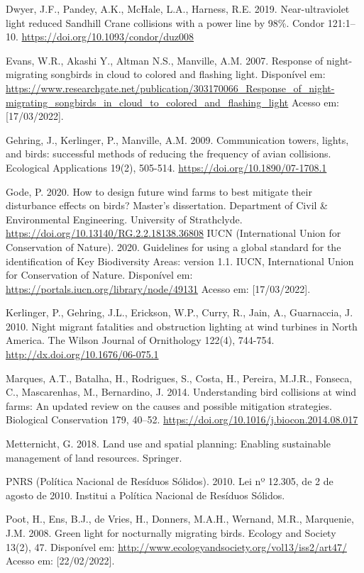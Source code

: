 \documentclass[
  oneside]{scrbook}
\begin{document}
Dwyer, J.F., Pandey, A.K., McHale, L.A., Harness, R.E. 2019. Near-ultraviolet light reduced Sandhill Crane collisions with a power line by 98\%. Condor 121:1--10. \url{https://doi.org/10.1093/condor/duz008}

Evans, W.R., Akashi Y., Altman N.S., Manville, A.M. 2007. Response of night-migrating songbirds in cloud to colored and flashing light. Disponível em: \url{https://www.researchgate.net/publication/303170066_Response_of_night-migrating_songbirds_in_cloud_to_colored_and_flashing_light} Acesso em: {[}17/03/2022{]}.

Gehring, J., Kerlinger, P., Manville, A.M. 2009. Communication towers, lights, and birds: successful methods of reducing the frequency of avian collisions. Ecological Applications 19(2), 505-514. \url{https://doi.org/10.1890/07-1708.1}

Gode, P. 2020. How to design future wind farms to best mitigate their disturbance effects on birds? Master's dissertation. Department of Civil \& Environmental Engineering. University of Strathclyde. \url{https://doi.org/10.13140/RG.2.2.18138.36808}
IUCN (International Union for Conservation of Nature). 2020. Guidelines for using a global standard for the identification of Key Biodiversity Areas: version 1.1. IUCN, International Union for Conservation of Nature. Disponível em: \url{https://portals.iucn.org/library/node/49131} Acesso em: {[}17/03/2022{]}.

Kerlinger, P., Gehring, J.L., Erickson, W.P., Curry, R., Jain, A., Guarnaccia, J. 2010. Night migrant fatalities and obstruction lighting at wind turbines in North America. The Wilson Journal of Ornithology 122(4), 744-754. \url{http://dx.doi.org/10.1676/06-075.1}

Marques, A.T., Batalha, H., Rodrigues, S., Costa, H., Pereira, M.J.R., Fonseca, C., Mascarenhas, M., Bernardino, J. 2014. Understanding bird collisions at wind farms: An updated review on the causes and possible mitigation strategies. Biological Conservation 179, 40--52. \url{https://doi.org/10.1016/j.biocon.2014.08.017}

Metternicht, G. 2018. Land use and spatial planning: Enabling sustainable management of land resources. Springer.

PNRS (Política Nacional de Resíduos Sólidos). 2010. Lei nº 12.305, de 2 de agosto de 2010. Institui a Política Nacional de Resíduos Sólidos.

Poot, H., Ens, B.J., de Vries, H., Donners, M.A.H., Wernand, M.R., Marquenie, J.M. 2008. Green light for nocturnally migrating birds. Ecology and Society 13(2), 47. Disponível em: \url{http://www.ecologyandsociety.org/vol13/iss2/art47/} Acesso em: {[}22/02/2022{]}.
\end{document}
